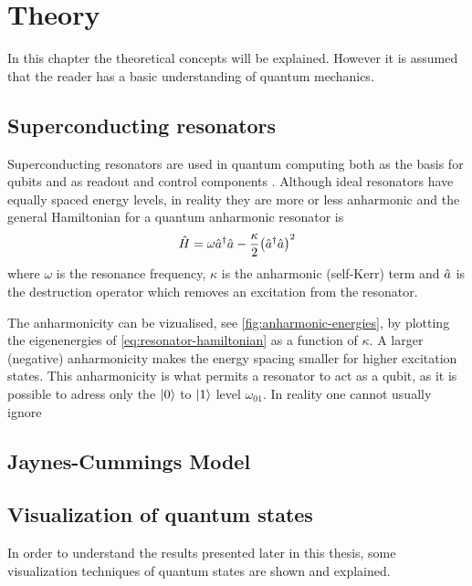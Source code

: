 \documentclass[main.tex]{subfiles}
\begin{document}
\chapter{Theory}
In this chapter the theoretical concepts will be explained.
However it is assumed that the reader has a basic understanding of quantum mechanics.

\section{Superconducting resonators}
Superconducting resonators are used in quantum computing both as the basis for qubits and as readout and control components \cite{}.
Although ideal resonators have equally spaced energy levels, in reality they are more or less anharmonic and the general Hamiltonian for a quantum anharmonic resonator is
\begin{equation}
    \hat{H} = \omega \hat{a}^\dagger\hat{a} - \frac{\kappa}{2} \qty(\hat{a}^\dagger\hat{a})^2
    \label{eq:resonator-hamiltonian}
\end{equation}
where \( \omega \) is the resonance frequency, \( \kappa \) is the anharmonic (self-Kerr) term and \(\hat{a}\) is the destruction operator which removes an excitation from the resonator.

The anharmonicity can be vizualised, see \cref{fig:anharmonic-energies}, by plotting the eigenenergies of \cref{eq:resonator-hamiltonian} as a function of \( \kappa \).
A larger (negative) anharmonicity makes the energy spacing smaller for higher excitation states.
This anharmonicity is what permits a resonator to act as a qubit, as it is possible to adress only the \( \ket{0} \) to \( \ket{1} \) level \( \omega_{01} \).
In reality one cannot usually ignore 


\section{Jaynes-Cummings Model}


\section{Visualization of quantum states}
In order to understand the results presented later in this thesis, some visualization techniques of quantum states are shown and explained.
\end{document}
